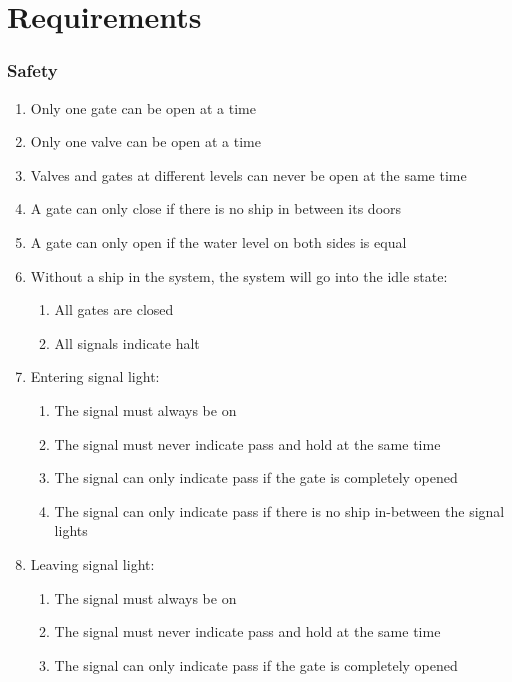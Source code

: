 \section{Requirements}
\subsubsection*{Safety}
\begin{enumerate}
	\item Only one gate can be open at a time
	\item Only one valve can be open at a time
	\item Valves and gates at different levels can never be open at the same time
	\item A gate can only close if there is no ship in between its doors
	\item A gate can only open if the water level on both sides is equal
	\item Without a ship in the system, the system will go into the idle state:
	\begin{enumerate}
		\item All gates are closed
		\item All signals indicate halt
	\end{enumerate}
	\item Entering signal light:
	\begin{enumerate}
		\item The signal must always be on
		\item The signal must never indicate pass and hold at the same time
		\item The signal can only indicate pass if the gate is completely opened
		\item The signal can only indicate pass if there is no ship in-between the signal lights
	\end{enumerate}
	\item Leaving signal light:
	\begin{enumerate}
		\item The signal must always be on
		\item The signal must never indicate pass and hold at the same time
		\item The signal can only indicate pass if the gate is completely opened
	\end{enumerate}
\end{enumerate}
	

